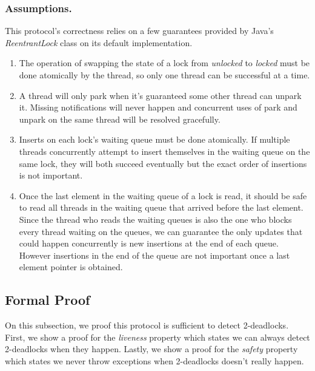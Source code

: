 \subsubsection{Assumptions.}
This protocol's correctness relies on a few guarantees provided by Java's \emph{ReentrantLock} class on its default implementation.
\begin{enumerate}
\item The operation of swapping the state of a lock from \emph{unlocked} to \emph{locked} must be done atomically by the thread, so only one thread can be successful at a time.
\item A thread will only park when it's guaranteed some other thread can unpark it. Missing notifications will never happen and concurrent uses of park and unpark on the same thread will be resolved gracefully.
\item Inserts on each lock's waiting queue must be done atomically. If multiple threads concurrently attempt to insert themselves in the waiting queue on the same lock, they will both succeed eventually but the exact order of insertions is not important.
\item Once the last element in the waiting queue of a lock is read, it should be safe to read all threads in the waiting queue that arrived before the last element. Since the thread who reads the waiting queues is also the one who blocks every thread waiting on the queues, we can guarantee the only updates that could happen concurrently is new insertions at the end of each queue. However insertions in the end of the queue are not important once a last element pointer is obtained.
\end{enumerate}

\subsection{Formal Proof}
On this subsection, we proof this protocol is sufficient to detect 2-deadlocks.
First, we show a proof for the \emph{liveness} property which states we can always detect 2-deadlocks when they happen.
Lastly, we show a proof for the \emph{safety} property which states we never throw exceptions when 2-deadlocks doesn't really happen.

